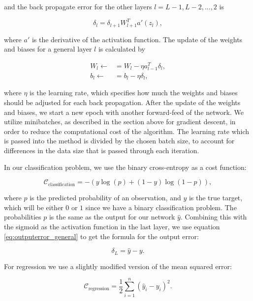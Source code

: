 and the back propagate error for the other layers $l = L-1, L-2, ..., 2$ is

\begin{equation}
    \delta_l = \delta_{l+1} W_{l+1}^T a'(z_l),
\end{equation}


where \(a'\) is the derivative of the activation function. The update of
the weights and biases for a general layer \(l\) is calculated by

\begin{align}
    W_l \leftarrow &= W_l - \eta a_{l-1}^T \delta_l,\\
    b_l \leftarrow &= b_l - \eta \delta_l,
\end{align}


where \(\eta\) is the learning rate, which specifies how much the
weights and biases should be adjusted for each back propagation. After the update of the weights and biases, we start a new epoch with another forward-feed of the network. We utilize minibatches, as described in the section above for gradient descent, in order to reduce the computational cost of the algorithm. The learning rate which is passed into the method is divided by the chosen batch size, to account for differences in the data size that is passed through each iteration.

In our classification problem, we use the binary cross-entropy as a cost
function:

\begin{equation}
\mathcal{C}_{\text{classification}} = - (y \log (p) + (1-y) \log (1 - p)),
\end{equation}

where \(p\) is the predicted probability of an observation, and \(y\) is
the true target, which will be either \(0\) or \(1\) since we have a
binary classification problem. The probabilities \(p\) is the same as
the output for our network \(\hat{y}\). Combining this with the sigmoid
as the activation function in the last layer, we use equation \ref{eq:outputerror_general} to get the formula for the output error:

\begin{equation}
    \label{eq:outputerror}
    \delta_L = \hat{y} - y.
\end{equation}

For regression we use a slightly modified version of the mean squared
error:

\begin{equation}
\mathcal{C}_{\text{regression}} = \frac{1}{2} \sum_{i=1}^n (\hat{y}_i - y_i)^2.
\end{equation}

